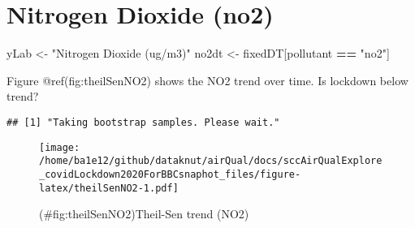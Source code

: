 \documentclass[]{article}
\newenvironment{Shaded}{\begin{snugshade}}{\end{snugshade}}
\newcommand{\KeywordTok}[1]{\textcolor[rgb]{0.13,0.29,0.53}{\textbf{#1}}}
\newcommand{\DataTypeTok}[1]{\textcolor[rgb]{0.13,0.29,0.53}{#1}}
\newcommand{\DecValTok}[1]{\textcolor[rgb]{0.00,0.00,0.81}{#1}}
\newcommand{\StringTok}[1]{\textcolor[rgb]{0.31,0.60,0.02}{#1}}
\newcommand{\CommentTok}[1]{\textcolor[rgb]{0.56,0.35,0.01}{\textit{#1}}}
\newcommand{\OtherTok}[1]{\textcolor[rgb]{0.56,0.35,0.01}{#1}}
\newcommand{\OperatorTok}[1]{\textcolor[rgb]{0.81,0.36,0.00}{\textbf{#1}}}
\newcommand{\NormalTok}[1]{#1}
\begin{document}
\section{Nitrogen Dioxide (no2)}\label{nitrogen-dioxide-no2}

\begin{Shaded}
\begin{Highlighting}[]
\NormalTok{yLab <-}\StringTok{ "Nitrogen Dioxide (ug/m3)"}
\NormalTok{no2dt <-}\StringTok{ }\NormalTok{fixedDT[pollutant }\OperatorTok{==}\StringTok{ "no2"}\NormalTok{]}
\end{Highlighting}
\end{Shaded}

Figure @ref(fig:theilSenNO2) shows the NO2 trend over time. Is lockdown
below trend?

\begin{Shaded}
\end{Shaded}

\begin{verbatim}
## [1] "Taking bootstrap samples. Please wait."
\end{verbatim}

\begin{figure}
\centering
\texttt{[image: /home/ba1e12/github/dataknut/airQual/docs/sccAirQualExplore\_covidLockdown2020ForBBCsnaphot\_files/figure-latex/theilSenNO2-1.pdf]}
\caption{(\#fig:theilSenNO2)Theil-Sen trend (NO2)}
\end{figure}
\end{document}
